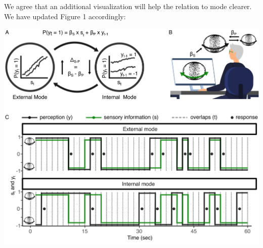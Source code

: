 \documentclass[
]{article}
\begin{document}
We agree that an additional visualization will help the relation to mode
clearer. We have updated Figure 1 accordingly:

\includegraphics{./modes_ketamine_scz_files/figure-latex/Figure_1.png}
\end{document}
